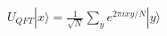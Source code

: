 \documentclass[preview]{standalone}
\begin{document}
\begin{align*}
U_{QFT} |x\rangle = \frac{1}{\sqrt{N}} \sum_{y}e^{2\pi ixy/N} |y\rangle
\end{align*}
\end{document}
